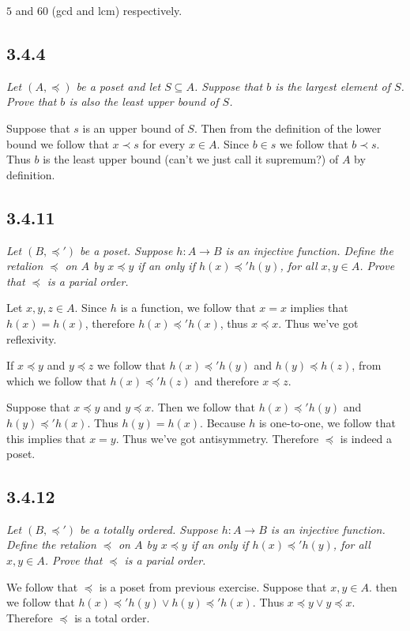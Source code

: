 \documentclass[11pt,oneside,titlepage]{book}
\begin{document}
$5$ and $60$ (gcd and lcm) respectively.

\subsection*{3.4.4}

\textit{Let $(A, \preceq)$ be a poset and let $S \subseteq A$. Suppose that $b$ is the
  largest element of $S$. Prove that $b$ is also the least upper bound of $S$.}

Suppose that $s$ is an upper bound of $S$. Then from the definition of the lower bound we
follow that $x \prec s$ for every $x \in A$. Since $b \in s$ we follow that $b \prec s$.
Thus $b$ is the least upper bound (can't we just call it supremum?) of $A$ by definition.

\subsection*{3.4.11}

\textit{Let $(B, \preceq')$ be a poset. Suppose $h: A \to B$ is an injective function.
  Define the retalion $\preceq$ on $A$ by $x \preceq y$ if an only if $h(x) \preceq' h(y)$,
  for all $x, y \in A$. Prove that $\preceq$ is a parial order.}

Let $x, y, z \in A$. Since $h$ is a function, we follow that $x = x$ implies that $h(x) = h(x)$,
therefore $h(x) \preceq' h(x)$, thus $x \preceq x$. Thus we've got reflexivity.

If $x \preceq y$ and $y \preceq z$ we follow that $h(x) \preceq' h(y)$ and $h(y) \preceq h(z)$,
from which we follow that $h(x) \preceq' h(z)$ and therefore $x \preceq z$.

Suppose that $x \preceq y$ and $y \preceq x$. Then we follow that $h(x) \preceq' h(y)$
and $h(y) \preceq' h(x)$. Thus $h(y) = h(x)$. Because $h$ is one-to-one, we follow that
this implies that $x = y$. Thus we've got antisymmetry. Therefore $\preceq$ is indeed a poset.

\subsection*{3.4.12}

\textit{Let $(B, \preceq')$ be a totally ordered. Suppose $h: A \to B$ is an injective function.
  Define the retalion $\preceq$ on $A$ by $x \preceq y$ if an only if $h(x) \preceq' h(y)$,
  for all $x, y \in A$. Prove that $\preceq$ is a parial order.}

We follow that $\preceq$ is a poset from previous exercise. Suppose that $x, y \in A$.
then we follow that $h(x) \preceq' h(y) \lor h(y) \preceq' h(x)$. Thus
$x \preceq y \lor y \preceq x$. Therefore $\preceq$ is a total order.
\end{document}

